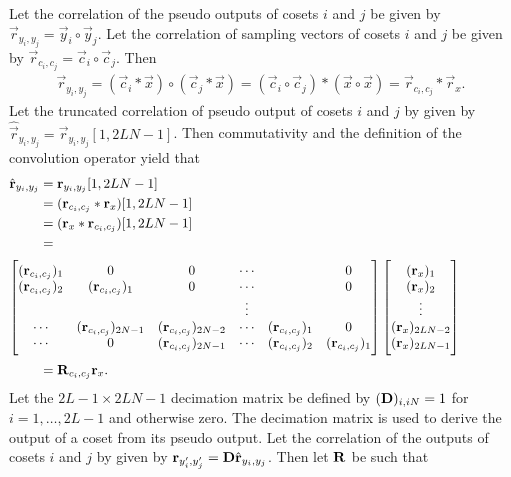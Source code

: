 \documentclass[a4paper, openany, oneside]{memoir}
\begin{document}
Let the correlation of the pseudo outputs of cosets $i$ and $j$ be given by $\vec{r}_{y_i,y_j} = \vec{y}_i \circ \vec{y}_j$. Let the correlation of sampling vectors of cosets $i$ and $j$ be given by $\vec{r}_{c_i,c_j} = \vec{c}_i \circ \vec{c}_j$. Then
\begin{align*}
    \vec{r}_{y_i,y_j} =(\vec{c}_i \ast \vec{x}) \circ (\vec{c}_j \ast \vec{x}) = (\vec{c}_i \circ \vec{c}_j) \ast (\vec{x} \circ \vec{x}) = \vec{r}_{c_i,c_j} \ast \vec{r}_x.
\end{align*}
Let the truncated correlation of pseudo output of cosets $i$ and $j$ by given by $\hat{\vec{r}}_{y_i,y_j} = \vec{r}_{y_i,y_j}[1,2LN-1]$. Then commutativity and the definition of the convolution operator yield that
\begin{align*}
    \hat{\vec{r}}_{y_i,y_j}
    &= \vec{r}_{y_i,y_j}[1,2LN-1] \\
    &= (\vec{r}_{c_i,c_j} \ast \vec{r}_x)[1,2LN-1] \\
    &= (\vec{r}_x \ast \vec{r}_{c_i,c_j})[1,2LN-1] \\
    &= \hskip \textwidth minus \textwidth \\ %
    \intertext{$\begin{bmatrix}
        (\vec{r}_{c_i,c_j})_1 & 0 & 0& \cdots & &  0 \\
        (\vec{r}_{c_i,c_j})_2 & (\vec{r}_{c_i,c_j})_1 & 0 & \cdots & & 0 \\
        &  & & \vdots &  & \\
        \cdots & (\vec{r}_{c_i,c_j})_{2N-1} & (\vec{r}_{c_i,c_j})_{2N-2} & \cdots & (\vec{r}_{c_i,c_j})_1 & 0 \\
        \cdots & 0 & (\vec{r}_{c_i,c_j})_{2N-1} & \cdots & (\vec{r}_{c_i,c_j})_2 & (\vec{r}_{c_i,c_j})_1 \\
    \end{bmatrix}
    \begin{bmatrix}
        (\vec{r}_x)_1 \\
        (\vec{r}_x)_2 \\
        \vdots \\
        (\vec{r}_x)_{2LN-2} \\
        (\vec{r}_x)_{2LN-1}
    \end{bmatrix}$}
    &= \mat{R}_{c_i,c_j} \vec{r}_x.
\end{align*}
Let the $2L-1\times 2LN-1$ decimation matrix be defined by $(\boldsymbol{\mathbf{D}})_{i,iN} = 1$ for $i=1,\ldots,2L-1$ and otherwise zero. The decimation matrix is used to derive the output of a coset from its pseudo output. Let the correlation of the outputs of cosets $i$ and $j$ by given by $\boldsymbol{\mathbf{r}}_{y'_i,y'_j} = \boldsymbol{\mathbf{D}} \hat{\boldsymbol{\mathbf{r}}}_{y_i,y_j}$. Then let $\boldsymbol{\mathbf{R}}$ be such that
\end{document}
